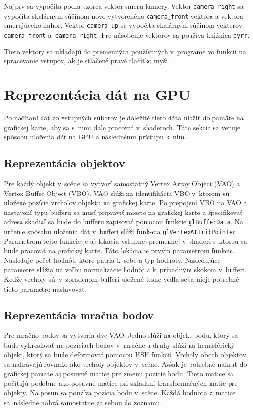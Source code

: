 Najprv sa vypočíta podľa vzorca vektor smeru kamery. Vektor \verb|camera_right| sa vypočíta skalárnym súčinom novo-vytvoreného \verb|camera_front| vektora a vektora smerujúceho nahor. Vektor \verb|camera_up| sa vypočíta skalárnym súčinom vektorov \verb|camera_front| a~\verb|camera_right|. Pre násobenie vektorov sa používa knižnica \verb|pyrr|. 

Tieto vektory sa ukladajú do premenných používaných v~programe vo funkcii na spracovanie vstupov, ak je stlačené pravé tlačítko myši.

\section{Reprezentácia dát na GPU}
Po načítaní dát zo vstupných súborov je dôležité tieto dáta uložiť do pamäte na grafickej karte, aby sa s~nimi dalo pracovať v~shaderoch. Táto sekcia sa venuje spôsobu uloženia dát na GPU a následnému prístupu k~nim.

\subsection*{Reprezentácia objektov}
Pre každý objekt v~scéne sa vytvorí samostatný Vertex Array Object (VAO) a Vertex Buffer Object (VBO). VAO slúži na identifikáciu VBO v~ktorom sú uložené pozície vrcholov objektu na grafickej karte. Po prepojení VBO na VAO a nastavení typu bufferu sa musí pripraviť miesto na grafickej karte a špecifikovať adresa skadiaľ sa bude do bufferu zapisovať pomocou funkcie \verb|glBufferData|. Na určenie spôsobu uloženia dát v~bufferi slúži funk-cia \verb|glVertexAttribPointer|. Parametrom tejto funkcie je aj lokácia vstupnej premennej v~shaderi s~ktorou sa bude pracovať na grafickej karte. Táto lokácia je prvým parametrom funkcie. Nasleduje počet hodnôt, ktoré patria k~sebe a typ hodnoty. Nasledujúce parametre slúžia na voľbu normalizácie hodnôt a k~prípadným skokom v~bufferi. Keďže vrcholy sú~v~zoradenom bufferi uložené tesne vedľa seba nieje potrebné tieto parametre nastavovať.

\subsection*{Reprezentácia mračna bodov}
Pre mračno bodov sa vytvoria dve VAO. Jedno slúži na objekt bodu, ktorý sa bude vykresľovať na pozíciach bodov v~mračne a druhý slúži na hemisférický objekt, ktorý sa bude deformovať pomocou HSH funkcií. Vrcholy oboch objektov sa nahrávajú rovnako ako vrcholy objektov v~scéne. Avšak je potrebné nahrať do grafickej pamäte aj posuvné matice pre zmenu pozície bodu. Tieto matice sa počítajú podobne ako posuvné matice pri skladaní transformačných matíc pre objekty. Na posun sa používa pozícia bodu v~scéne. Každá hodnota z~matice sa~následne nahrá samostatne za sebou do zoznamu.

